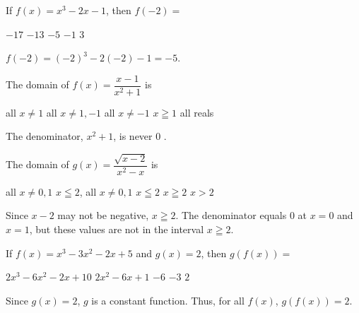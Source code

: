%

\question
If $f(x)=x^{3}-2 x-1$, then $f(-2)=$
\begin{choices}
  \choice $-17$
  \choice $-13$
  \CorrectChoice $-5$
  \choice $-1$
  \choice $3$
\end{choices}
\begin{solution}
$f(-2)=(-2)^{3}-2(-2)-1=-5$.
\end{solution}

\question
The domain of $f(x)=\dfrac{x-1}{x^{2}+1}$ is
\begin{choices}
  \choice all $x \neq 1$
  \choice all $x \neq 1,-1$
  \choice all $x \neq-1$
  \choice $x \geqq 1$
  \CorrectChoice all reals
\end{choices}
\begin{solution}
The denominator, $x^{2}+1$, is never 0 .
\end{solution}

\question
The domain of $g(x)=\dfrac{\sqrt{x-2}}{x^{2}-x}$ is
\begin{choices}
  \choice all $x \neq 0,1$
  \choice $x \leqq 2$, all $x \neq 0,1$
  \choice $x \leqq 2$
  \CorrectChoice $x \geqq 2$
  \choice $x>2$
\end{choices}
\begin{solution}
Since $x-2$ may not be negative, $x \geqq 2$. The denominator equals 0 at $x=0$ and $x=1$, but these values are not in the interval $x \geqq 2$.
\end{solution}


\question\label{calc01:g-of-f}
If $f(x)=x^{3}-3 x^{2}-2 x+5$ and $g(x)=2$, then $g(f(x))=$
\begin{choices}
  \choice $2 x^{3}-6 x^{2}-2 x+10$
  \choice $2 x^{2}-6 x+1$
  \choice $-6$
  \choice $-3$
  \CorrectChoice $2$
\end{choices}
\begin{solution}
Since $g(x)=2$, $g$ is a constant function. Thus, for all $f(x)$, $g(f(x))=2$.
\end{solution}

\newpage

